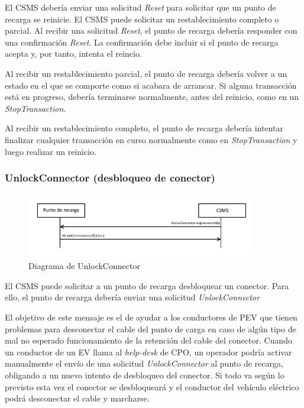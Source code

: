 \documentclass[12pt,a4paper,onecolumn,oneside]{report}
\begin{document}
El CSMS debería enviar una solicitud \textit{Reset} para solicitar que un punto de recarga se reinicie. El CSMS puede solicitar un restablecimiento completo o parcial. Al recibir una solicitud \textit{Reset}, el punto de recarga debería responder con una confirmación \textit{Reset}. La confirmación debe incluir si el punto de recarga acepta y, por tanto, intenta el reincio.

Al recibir un restablecimiento parcial, el punto de recarga debería volver a un estado en el que se comporte como si acabara de arrancar. Si alguna transacción está en progreso, debería terminarse normalmente, antes del reinicio, como en un \textit{StopTransaction}.

Al recibir un restablecimiento completo, el punto de recarga debería intentar finalizar cualquier transacción en curso normalmente como en \textit{StopTransaction} y luego realizar un reinicio.


\subsubsection{UnlockConnector (desbloqueo de conector)}
\label{UnlockConnector (desbloqueo de conector)}


\begin{figure}[h] 
\centering
  \includegraphics[width=0.9\textwidth]{figuras/diagramaunlockconnector.png}
  \caption[Diagrama de \textit{UnlockConnector}]{Diagrama de UnlockConnector\\
  }
  \label{fig:diagramaunlockconnector}
\end{figure}


El CSMS puede solicitar a un punto de recarga desbloquear un conector. Para ello, el punto de recarga debería enviar una solicitud \textit{UnlockConnector}

El objetivo de este mensaje es el de ayudar a los conductores de PEV que tienen problemas para desconectar el cable del punto de carga en caso de algún tipo de mal  no esperado funcionamiento de la retención del cable del conector. Cuando un conductor de un EV llama al \textit{help-desk} de CPO, un operador podría activar manualmente el envío de una solicitud \textit{UnlockConnector} al punto de recarga, obligando a un nuevo intento de desbloqueo del conector. Si todo va según lo previsto esta vez el conector se desbloqueará y el conductor del vehículo eléctrico podrá desconectar el cable y marcharse.
\end{document}
